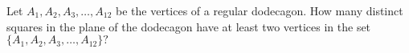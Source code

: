 Let $A_1, A_2, A_3, \ldots, A_{12}$ be the vertices of a regular dodecagon.  How many distinct squares in the plane of the dodecagon have at least two vertices in the set $\{A_1,A_2,A_3,\ldots,A_{12}\}?$
